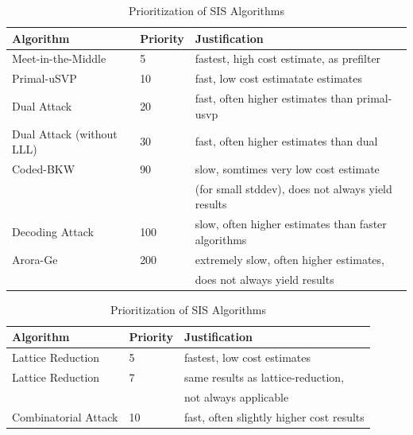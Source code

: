 \begin{table}[h!]
    \centering
    \begin{tabular}[]{lll}
        \toprule
        Algorithm                 & Priority & Justification                                       \\\hline
        Meet-in-the-Middle        & 5        & fastest, high cost estimate, as prefilter           \\
        Primal-uSVP               & 10       & fast, low cost estimatate estimates                 \\
        Dual Attack               & 20       & fast, often higher estimates than primal-usvp       \\
        Dual Attack (without LLL) & 30       & fast, often higher estimates than dual              \\
        Coded-BKW                 & 90       & slow, somtimes very low cost estimate               \\
                                  &          & (for small stddev), does not always yield results   \\
        Decoding Attack           & 100      & slow, often higher estimates than faster algorithms \\
        Arora-Ge                  & 200      & extremely slow, often higher estimates,             \\
                                  &          & does not always yield results                       \\
        \bottomrule
    \end{tabular}
    \caption{Prioritization of LWE Algorithms}\label{tab:lwe-alg-prio}
    \vspace{1cm}
    \begin{tabular}[]{lll}
        \toprule
        Algorithm                     & Priority & Justification                            \\\hline
        Lattice Reduction \cite{MR09} & 5        & fastest, low cost estimates              \\
        Lattice Reduction \cite{RS10} & 7        & same results as lattice-reduction,       \\
                                      &          & not always applicable                    \\
        Combinatorial Attack          & 10       & fast, often slightly higher cost results \\
        \bottomrule
    \end{tabular}
    \caption{Prioritization of SIS Algorithms}\label{tab:sis-alg-prio}
\end{table}


